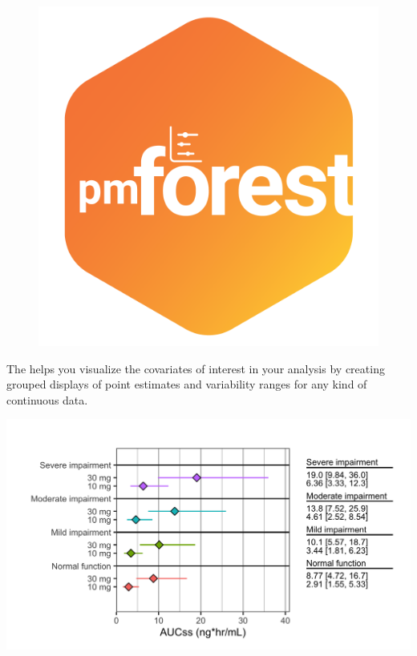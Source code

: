 \documentclass[portrait,fontscale=0.46,paperwidth=36in,paperheight=48in]{baposter}
\begin{document}
\begin{poster}
{\hspace{0.667\linewidth}
\begin{minipage}[c]{0.333\linewidth}
	\vspace{-8cm} %
	\begin{demobx}[]
		
		\begin{figure}
			\vspace{-6mm}\hspace{-4mm}
			\includegraphics[scale=0.0775]{"images/pmForest-Hex.png"} 
		\end{figure}
		The  helps you visualize the covariates of interest in your analysis by creating grouped displays of point estimates and variability ranges for any kind of continuous data. 
		
		\hspace{-6mm}
		\includegraphics[scale=0.18]{"images/forest.png"}
		\vspace{-7mm}


\end{demobx}
\end{minipage}}
\end{poster}
\end{document}
